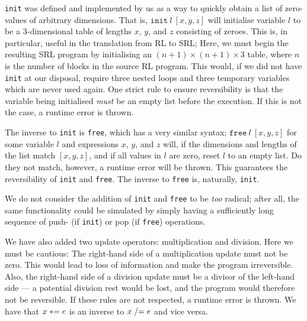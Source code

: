 \texttt{init} was defined and implemented by us as a way to quickly obtain a list of zero-values of arbitrary dimensions. That is, $\texttt{init} \ l \ [x,y,z]$ will initialise variable $l$ to be a 3-dimensional table of lengths $x$, $y$, and $z$ consisting of zeroes. This is, in particular, useful in the translation from RL to SRL; Here, we must begin the resulting SRL program by initialising an $(n+1) \times (n+1) \times 3$ table, where $n$ is the number of blocks in the source RL program. This would, if we did not have \texttt{init} at our disposal, require three nested loops and three temporary variables which are never used again. One strict rule to ensure reversibility is that the variable being initialised \textit{must} be an empty list before the execution. If this is not the case, a runtime error is thrown.

The inverse to \texttt{init} is \texttt{free}, which has a very similar syntax; $\texttt{free} \ l \ [x,y,z]$ for some variable $l$ and expressions $x$, $y$, and $z$ will, if the dimensions and lengths of the list match $[x,y,z]$, and if all values in $l$ are zero, reset $l$ to an empty list. Do they not match, however, a runtime error will be thrown. This guarantees the reversibility of \texttt{init} and \texttt{free}. The inverse to \texttt{free} is, naturally, \texttt{init}.

We do not consider the addition of \texttt{init} and \texttt{free} to be \textit{too} radical; after all, the same functionality could be simulated by simply having a sufficiently long sequence of push- (if \texttt{init}) or pop (if \texttt{free}) operations.

We have also added two update operators: multiplication and division. Here we must be cautious: The right-hand side of a multiplication update must not be zero. This would lead to loss of information and make the program irreversible. Also, the right-hand side of a division update must be a divisor of the left-hand side --- a potential division rest would be lost, and the program would therefore not be reversible. If these rules are not respected, a runtime error is thrown. We have that $x \mathrel{*}= e$ is an inverse to $x \mathrel{/}= e$ and vice versa.

